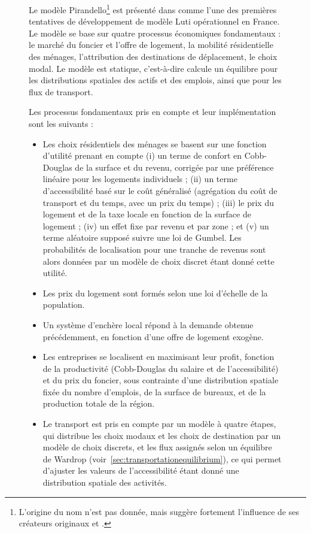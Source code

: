 \begin{figure}
	\begin{mdframed}
	
	Le modèle Pirandello\textregistered\footnote{L'origine du nom n'est pas donnée, mais suggère fortement l'influence de ses créateurs originaux  et .} est présenté dans \cite{delons:hal-00319087} comme l'une des premières tentatives de développement de modèle Luti opérationnel en France. Le modèle se base sur quatre processus économiques fondamentaux : le marché du foncier et l'offre de logement, la mobilité résidentielle des ménages, l'attribution des destinations de déplacement, le choix modal. Le modèle est statique, c'est-à-dire calcule un équilibre pour les distributions spatiales des actifs et des emplois, ainsi que pour les flux de transport.
	
	Les processus fondamentaux pris en compte et leur implémentation sont les suivants :
	\begin{itemize}
		\item Les choix résidentiels des ménages se basent sur une fonction d'utilité prenant en compte (i) un terme de confort en Cobb-Douglas de la surface et du revenu, corrigée par une préférence linéaire pour les logements individuels ; (ii) un terme d'accessibilité basé sur le coût généralisé (agrégation du coût de transport et du temps, avec un prix du temps) ; (iii) le prix du logement et de la taxe locale en fonction de la surface de logement ; (iv) un effet fixe par revenu et par zone ; et (v) un terme aléatoire supposé suivre une loi de Gumbel. Les probabilités de localisation pour une tranche de revenus sont alors données par un modèle de choix discret étant donné cette utilité.
		\item Les prix du logement sont formés selon une loi d'échelle de la population.
		\item Un système d'enchère local répond à la demande obtenue précédemment, en fonction d'une offre de logement exogène.
		\item Les entreprises se localisent en maximisant leur profit, fonction de la productivité (Cobb-Douglas du salaire et de l'accessibilité) et du prix du foncier, sous contrainte d'une distribution spatiale fixée du nombre d'emplois, de la surface de bureaux, et de la production totale de la région.
		\item Le transport est pris en compte par un modèle à quatre étapes, qui distribue les choix modaux et les choix de destination par un modèle de choix discrets, et les flux assignés selon un équilibre de Wardrop (voir~\ref{sec:transportationequilibrium}), ce qui permet d'ajuster les valeurs de l'accessibilité étant donné une distribution spatiale des activités.
	\end{itemize}
	

\end{mdframed}
\end{figure}
